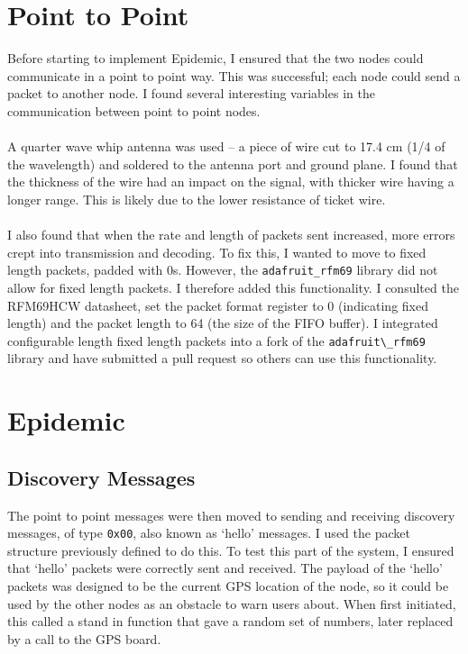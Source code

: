 \documentclass[12pt,a4paper]{report}
\begin{document}
\section{Point to Point}
Before starting to implement Epidemic, I ensured that the two nodes could communicate in a point to point way. This was successful; each node could send a packet to another node. I found several interesting variables in the communication between point to point nodes. \\ \\
A quarter wave whip antenna was used -- a piece of wire cut to 17.4 cm (1/4 of the wavelength) and soldered to the antenna port and ground plane. I found that the thickness of the wire had an impact on the signal, with thicker wire having a longer range. This is likely due to the lower resistance of ticket wire. \\ \\ 
I also found that when the rate and length of packets sent increased, more errors crept into transmission and decoding. To fix this, I wanted to move to fixed length packets, padded with 0s. However, the \verb'adafruit_rfm69' library did not allow for fixed length packets. I therefore added this functionality. I consulted the RFM69HCW datasheet, set the packet format register to 0 (indicating fixed length) and the packet length to 64 (the size of the FIFO buffer). I integrated configurable length fixed length packets into a fork of the \verb'adafruit\_rfm69' library and have submitted a pull request so others can use this functionality. 

\section{Epidemic}
\subsection{Discovery Messages}
The point to point messages were then moved to sending and receiving discovery messages, of type \verb'0x00', also known as `hello' messages. I used the packet structure previously defined to do this. To test this part of the system, I ensured that `hello' packets were correctly sent and received. The payload of the `hello' packets was designed to be the current GPS location of the node, so it could be used by the other nodes as an obstacle to warn users about. When first initiated, this called a stand in function that gave a random set of numbers, later replaced by a call to the GPS board. 
\end{document}
